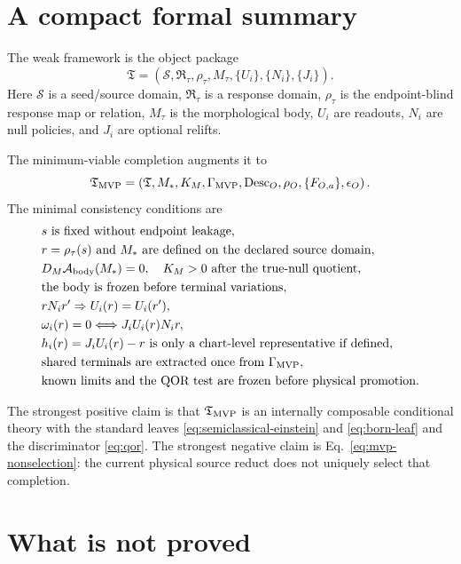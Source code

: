 \documentclass[11pt]{article}
\newcommand{\Ssrc}{\mathcal S}
\newcommand{\RTspace}{\mathfrak R_{\tau}}
\newcommand{\Rmap}{\rho_{\tau}}
\newcommand{\Mta}{M_{\tau}}
\newcommand{\Desc}{\operatorname{Desc}}
\newcommand{\GMVP}{\Gamma_{\mathrm{MVP}}}
\begin{document}
\section{A compact formal summary}

The weak framework is the object package
\[
  \mathfrak T
  =
  (\Ssrc,\RTspace,\Rmap,\Mta,\{U_i\},\{N_i\},\{J_i\}).
\]
Here \(\Ssrc\) is a seed/source domain, \(\RTspace\) is a response
domain, \(\Rmap\) is the endpoint-blind response map or relation, \(\Mta\) is
the morphological body, \(U_i\) are readouts, \(N_i\) are null policies, and
\(J_i\) are optional relifts.

The minimum-viable completion augments it to
\begin{equation}
  \mathfrak T_{\rm MVP}
  =\left(\mathfrak T,M_*,K_M,\GMVP,\Desc_O,
  \rho_O,\{F_{O,a}\},\epsilon_O\right).
  \label{eq:compact-mvp}
\end{equation}
The minimal consistency conditions are
\begin{align}
  &s \text{ is fixed without endpoint leakage},\\
  &r=\Rmap(s) \text{ and }M_*\text{ are defined on the declared source domain},\\
  &D_M\mathcal A_{\rm body}(M_*)=0,
    \quad K_M>0\text{ after the true-null quotient},\\
  &\text{the body is frozen before terminal variations},\\
  &r N_i r' \Rightarrow U_i(r)=U_i(r'),\\
  &\omega_i(r)=0 \Longleftrightarrow J_iU_i(r)N_i r,\\
  &h_i(r)=J_iU_i(r)-r \text{ is only a chart-level representative if defined},\\
  &\text{shared terminals are extracted once from }\GMVP,\\
  &\text{known limits and the QOR test are frozen before physical promotion}.
\end{align}

The strongest positive claim is that \(\mathfrak T_{\rm MVP}\) is an
internally composable conditional theory with the standard leaves
\eqref{eq:semiclassical-einstein} and \eqref{eq:born-leaf} and the discriminator
\eqref{eq:qor}.  The strongest negative claim is
Eq.~\eqref{eq:mvp-nonselection}: the current physical source reduct does not
uniquely select that completion.

\section{What is not proved}
\end{document}

